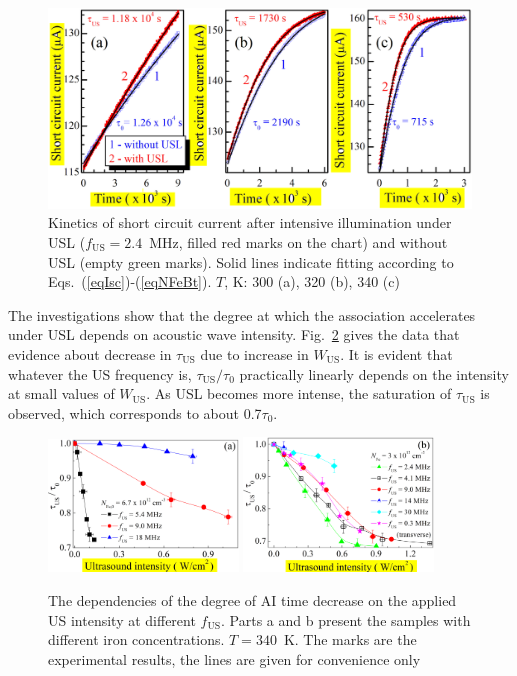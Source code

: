 \documentclass[sn-mathphys]{sn-jnl}%
\theoremstyle{thmstyleone}%
\theoremstyle{thmstyletwo}%
\theoremstyle{thmstylethree}%
\begin{document}
\begin{figure}
\centering
 \includegraphics[width=1.0\textwidth]{Fig3}
\caption{
Kinetics of short circuit current  after intensive illumination under USL
($f_\mathrm{US} = 2.4$~MHz, filled red marks on the chart)
and without USL (empty green marks).
Solid lines indicate fitting according to Eqs.~(\ref{eqIsc})-(\ref{eqNFeBt}).
$T$, K: 300 (a), 320 (b), 340 (c)
}
\label{figIscUs}       %
\end{figure}

The investigations show that the degree at which the association accelerates
under USL depends on acoustic wave intensity.
Fig.~\ref{figfus} gives the data that evidence about decrease
in $\tau_\mathrm{US}$ due to increase in $W_\mathrm{US}$.
It is evident that whatever the US frequency is, $\tau_\mathrm{US}/\tau_{0}$
practically linearly depends on the intensity at small values of $W_\mathrm{US}$.
As USL becomes more intense, the saturation of $\tau_\mathrm{US}$ is observed,
which corresponds to about 0.7$\tau_{0}$.

\begin{figure}
\centering
 \includegraphics[width=0.45\textwidth]{Fig4a}
 \includegraphics[width=0.45\textwidth]{Fig4b}
\caption{
The dependencies of the degree of AI time decrease on the applied US intensity at different $f_\mathrm{US}$.
Parts a and b present the samples with different iron concentrations.
$T=340$~K.
The marks are the experimental results, the lines are given for convenience only
}
\label{figfus}       %
\end{figure}
\end{document}
